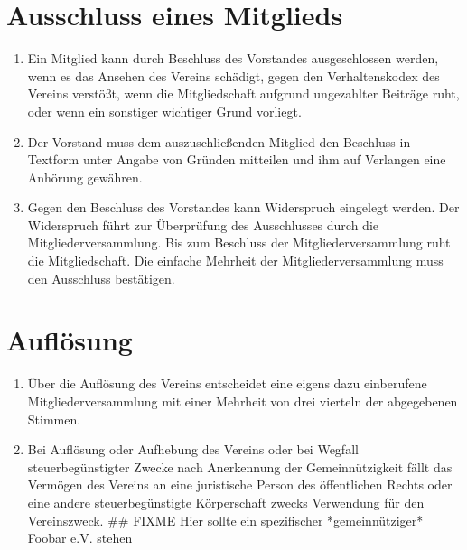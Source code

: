 \documentclass[a4paper, 12pt]{scrartcl}
\begin{document}
\section{Ausschluss eines Mitglieds}
\begin{enumerate}
  \item Ein Mitglied kann durch Beschluss des Vorstandes ausgeschlossen werden, wenn es das Ansehen des Vereins schädigt, gegen den Verhaltenskodex des Vereins verstößt, wenn die Mitgliedschaft aufgrund ungezahlter Beiträge ruht, oder wenn ein sonstiger wichtiger Grund vorliegt.
  \item Der Vorstand muss dem auszuschließenden Mitglied den Beschluss in Textform unter Angabe von Gründen mitteilen und ihm auf Verlangen eine Anhörung gewähren.
  \item Gegen den Beschluss des Vorstandes kann Widerspruch eingelegt werden. Der Widerspruch führt zur Überprüfung des Ausschlusses durch die Mitgliederversammlung. Bis zum Beschluss der Mitgliederversammlung ruht die Mitgliedschaft. Die einfache Mehrheit der Mitgliederversammlung muss den Ausschluss bestätigen.
\end{enumerate}

\section{Auflösung}
\begin{enumerate}
  \item Über die Auflösung des Vereins entscheidet eine eigens dazu einberufene Mitgliederversammlung mit einer Mehrheit von drei vierteln der abgegebenen Stimmen.
  \item Bei Auflösung oder Aufhebung des Vereins oder bei Wegfall steuerbegünstigter Zwecke nach Anerkennung der Gemeinnützigkeit fällt das Vermögen des Vereins an eine juristische Person des öffentlichen Rechts oder eine andere steuerbegünstigte Körperschaft zwecks Verwendung für den Vereinszweck.  ## FIXME Hier sollte ein spezifischer *gemeinnütziger* Foobar e.V. stehen
\end{enumerate}
\end{document}
